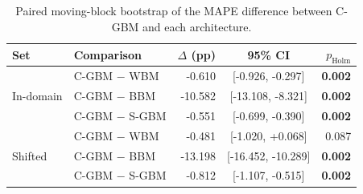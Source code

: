 \begin{table}[!t]
\centering
\caption{Paired moving-block bootstrap of the MAPE difference between C-GBM and each architecture.}
\label{tab:block-bootstrap-mape}
\footnotesize
\setlength{\tabcolsep}{4pt}
\renewcommand{\arraystretch}{1.06}
\begin{tabular}{llrcr}
\toprule
\rowcolor{gray!10}
\textbf{Set} & \textbf{Comparison} & \textbf{$\Delta$ (pp)} & \textbf{95\% CI} & \textbf{$p_{\mathrm{Holm}}$}\\
\midrule
\multirow{3}{*}{In-domain} & C-GBM $-$ WBM & -0.610 & [-0.926, -0.297] & \textbf{0.002}\\
 & C-GBM $-$ BBM & -10.582 & [-13.108, -8.321] & \textbf{0.002}\\
 & C-GBM $-$ S-GBM & -0.551 & [-0.699, -0.390] & \textbf{0.002}\\
\midrule
\multirow{3}{*}{Shifted} & C-GBM $-$ WBM & -0.481 & [-1.020, +0.068] & 0.087\\
 & C-GBM $-$ BBM & -13.198 & [-16.452, -10.289] & \textbf{0.002}\\
 & C-GBM $-$ S-GBM & -0.812 & [-1.107, -0.515] & \textbf{0.002}\\
\bottomrule
\end{tabular}
\end{table}
